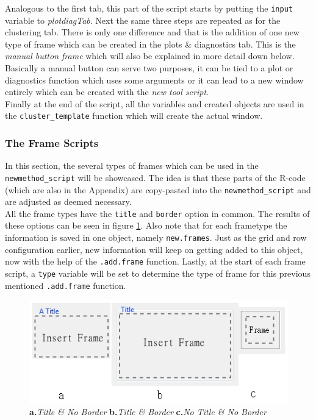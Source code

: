 \documentclass[a4paper]{article}\usepackage[]{graphicx}\usepackage[]{color}
\begin{document}
\noindent Analogous to the first tab, this part of the script starts by
putting the \verb|input| variable to {\it plotdiagTab}. Next the same three
steps are repeated as for the clustering tab. There is only one difference and
that is the addition of one new type of frame which can be created in the plots
\& diagnostics tab.
This is the {\it manual button frame} which will also be explained in more
detail down below. Basically a manual button can serve two purposes, it can be
tied to a plot or diagnostics function which uses some arguments or it can lead
to a new window entirely which can be created with the {\it new tool script}.\\
Finally at the end of the script, all the variables and created objects are used
in the \verb|cluster_template| function which will create the actual window.

\subsubsection{The Frame Scripts}
In this section, the several types of frames which can be used in the
\verb|newmethod_script| will be showcased. The idea is that these parts of the
R-code (which are also in the Appendix) are copy-pasted into the
\verb|newmethod_script| and are adjusted as deemed necessary. \\
All the frame types have the \verb|title| and
\verb|border| option in common. The results of these options can be seen in
figure \ref{titleborder}. Also note that for each frametype the information is saved in
one object, namely \verb|new.frames|. Just as the grid and row configuration
earlier, new information will keep on getting added to this object, now with
the help of the \verb|.add.frame| function. Lastly, at the start of each frame
script, a \verb|type| variable will be set to determine the type of frame for
this previous mentioned \verb|.add.frame| function.

\begin{figure}[H]
\centering
\includegraphics[scale=0.5]{figures/title_border.png}
\caption{{\bf a.}{\it Title \& No Border} {\bf b.}{\it Title \& Border} {\bf
c.}{\it No Title \& No Border}
\label{titleborder}}
\end{figure}
\end{document}
